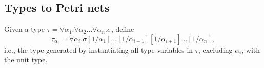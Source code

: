 \documentclass[../../Dissertation.tex]{subfiles}
\begin{document}
\subsection{Types to Petri nets}\label{sec:TypeToPetri}

\begin{definition}
  Given a type $\tau = \forall \alpha_1.\forall \alpha_2\ldots\forall \alpha_n.\sigma$, define
  \begin{equation*}
    \tau_{\alpha_i} = \forall \alpha_i.\sigma[1/\alpha_1]\ldots[1/\alpha_{i-1}][1/\alpha_{i+1}]\ldots[1/\alpha_n],
  \end{equation*}
  i.e., the type generated by instantiating all type variables in $\tau$, excluding $\alpha_i$, with the unit type.
\end{definition}

\begin{definition}
\end{definition}
\end{document}
